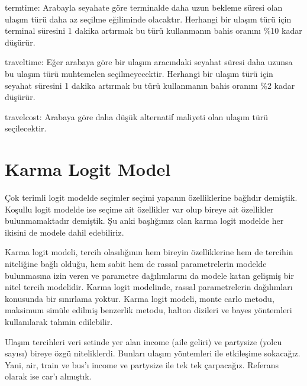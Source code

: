 \documentclass[
]{book}
\newenvironment{Shaded}{\begin{snugshade}}{\end{snugshade}}
\newcommand{\DataTypeTok}[1]{\textcolor[rgb]{0.13,0.29,0.53}{#1}}
\newcommand{\KeywordTok}[1]{\textcolor[rgb]{0.13,0.29,0.53}{\textbf{#1}}}
\newcommand{\NormalTok}[1]{#1}
\newcommand{\OperatorTok}[1]{\textcolor[rgb]{0.81,0.36,0.00}{\textbf{#1}}}
\newcommand{\StringTok}[1]{\textcolor[rgb]{0.31,0.60,0.02}{#1}}
\begin{document}
termtime: Arabayla seyahate göre terminalde daha uzun bekleme süresi olan ulaşım türü daha az seçilme eğiliminde olacaktır. Herhangi bir ulaşım türü için terminal süresini 1 dakika artırmak bu türü kullanmanın bahis oranını \%10 kadar düşürür.

traveltime: Eğer arabaya göre bir ulaşım aracındaki seyahat süresi daha uzunsa bu ulaşım türü muhtemelen seçilmeyecektir. Herhangi bir ulaşım türü için seyahat süresini 1 dakika artırmak bu türü kullanmanın bahis oranını \%2 kadar düşürür.

travelcost: Arabaya göre daha düşük alternatif maliyeti olan ulaşım türü seçilecektir.

\hypertarget{karma-logit-model}{%
\section{Karma Logit Model}\label{karma-logit-model}}

Çok terimli logit modelde seçimler seçimi yapanın özelliklerine bağlıdır demiştik. Koşullu logit modelde ise seçime ait özellikler var olup bireye ait özellikler bulunmamaktadır demiştik. Şu anki başlığımız olan karma logit modelde her ikisini de modele dahil edebiliriz.

Karma logit modeli, tercih olasılığının hem bireyin özelliklerine hem de tercihin niteliğine bağlı olduğu, hem sabit hem de rassal parametrelerin modelde bulunmasına izin veren ve parametre dağılımlarını da modele katan gelişmiş bir nitel tercih modelidir. Karma logit modelinde, rassal parametrelerin dağılımları konusunda bir sınırlama yoktur. Karma logit modeli, monte carlo metodu, maksimum simüle edilmiş benzerlik metodu, halton dizileri ve bayes yöntemleri kullanılarak tahmin edilebilir.

Ulaşım tercihleri veri setinde yer alan income (aile geliri) ve partysize (yolcu sayısı) bireye özgü niteliklerdi. Bunları ulaşım yöntemleri ile etkileşime sokacağız. Yani, air, train ve bus'ı income ve partysize ile tek tek çarpacağız. Referans olarak ise car'ı almıştık.

\begin{Shaded}
\end{Shaded}
\end{document}

